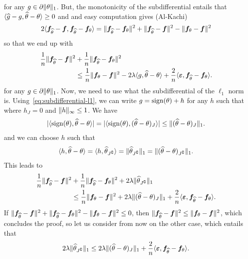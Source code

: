 for any $g \in \partial \| \theta \|_1$. 
But, the monotonicity of the subdifferential entails that $\langle \widehat g - g, \widehat \theta - \theta \rangle \geq 0$ and and easy computation gives (Al-Kachi)
\begin{equation*}
	2 \langle  {\boldsymbol f}_{\widehat \theta} - {\boldsymbol f}, {\boldsymbol f}_{\widehat \theta} - {\boldsymbol f}_{\theta} \rangle 
	= \| {\boldsymbol f}_{\widehat \theta} - {\boldsymbol f}_{\theta} \|^2 
	+ \| {\boldsymbol f}_{\widehat \theta} - {\boldsymbol f} \|^2
	- \| {\boldsymbol f}_{\theta} - {\boldsymbol f} \|^2
\end{equation*}
so that we end up with
\begin{align*}
	\frac 1n \| {\boldsymbol f}_{\widehat \theta} - {\boldsymbol f} \|^2 &
	+ \frac 1n \| {\boldsymbol f}_{\widehat \theta} - {\boldsymbol f}_{\theta} \|^2 \\
	&\leq \frac 1n \| {\boldsymbol f}_{\theta} - {\boldsymbol f} \|^2
    - 2 \lambda \langle g, \widehat \theta - \theta \rangle 
	+ \frac 2n  \langle \operatorname{\boldsymbol \varepsilon},  {\boldsymbol f}_{\widehat \theta} - {\boldsymbol f}_\theta \rangle.
\end{align*}
for any $g \in \partial \| \theta \|_1$.
Now, we need to use what the subdifferential of the $\ell_1$ norm is.
Using~\eqref{eq:subdifferential-l1}, we can write $g = \operatorname{sign}(\theta) + h$ for any $h$ such that where $h_J = 0$ and $\| h \|_\infty \leq 1$.
We have 
\begin{equation*}
	|\langle \operatorname{sign}(\theta), \widehat \theta - \theta \rangle| = |\langle \operatorname{sign}(\theta), (\widehat \theta - \theta)_J \rangle| \leq \| (\widehat \theta - \theta)_J \|_1.
\end{equation*}
and we can choose $h$ such that
\begin{equation*}
	\langle h, \widehat \theta - \theta \rangle = \langle h, \widehat \theta_{J^\complement} \rangle 
	= \| \widehat \theta_{J^\complement} \|_1 
	= \| (\widehat \theta - \theta)_{J^\complement} \|_1.
\end{equation*}
This leads to
\begin{align*}
	\frac 1n \| {\boldsymbol f}_{\widehat \theta} - {\boldsymbol f} \|^2 &+ \frac 1n \| {\boldsymbol f}_{\widehat \theta} - {\boldsymbol f}_{\theta} \|^2
	+ 2 \lambda \| \widehat \theta_{J^\complement} \|_1 \\
	&\leq \frac 1n \| {\boldsymbol f}_{\theta} - {\boldsymbol f} \|^2
    + 2 \lambda \| (\widehat \theta - \theta)_J \|_1
	+ \frac 2n  \langle \operatorname{\boldsymbol \varepsilon},  {\boldsymbol f}_{\widehat \theta} - {\boldsymbol f}_\theta \rangle.
\end{align*}
If $\| {\boldsymbol f}_{\widehat \theta} - {\boldsymbol f} \|^2 + \| {\boldsymbol f}_{\widehat \theta} - {\boldsymbol f}_{\theta} \|^2 - \| {\boldsymbol f}_{\theta} - {\boldsymbol f} \|^2 \leq 0$, then $\| {\boldsymbol f}_{\widehat \theta} - {\boldsymbol f} \|^2 \leq \| {\boldsymbol f}_{\theta} - {\boldsymbol f} \|^2$, which concludes the proof, so let us consider from now on the other case, which entails that
\begin{equation}
	\label{eq:lasso-proof-on-A}
	2 \lambda \| \widehat \theta_{J^\complement} \|_1 
	\leq 2 \lambda \| (\widehat \theta - \theta)_J \|_1
	+ \frac 2n  \langle \operatorname{\boldsymbol \varepsilon},  {\boldsymbol f}_{\widehat \theta} - {\boldsymbol f}_\theta \rangle.
\end{equation}
